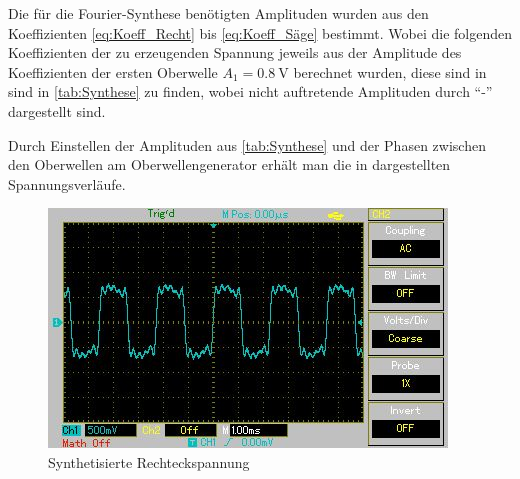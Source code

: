 Die für die Fourier-Synthese benötigten Amplituden wurden aus den Koeffizienten \cref{eq:Koeff_Recht} bis \cref{eq:Koeff_Säge}
bestimmt. Wobei die folgenden Koeffizienten der zu erzeugenden Spannung jeweils aus 
der Amplitude des Koeffizienten der ersten Oberwelle $A_{1} = \SI{0.8}{\volt}$
berechnet wurden, diese sind in 
%
sind in \cref{tab:Synthese} zu finden, wobei nicht auftretende
Amplituden durch \enquote{-} dargestellt sind. 

  

Durch Einstellen der Amplituden aus \cref{tab:Synthese} und der Phasen zwischen den Oberwellen am Oberwellengenerator
erhält man die in  dargestellten Spannungsverläufe.

\begin{figure}[h!]
	\centering
	\includegraphics[scale=0.8]{Grafiken/Rechteckspannung.jpg}
	\caption{Synthetisierte Rechteckspannung}
	\label{fig:Recht}
\end{figure}

